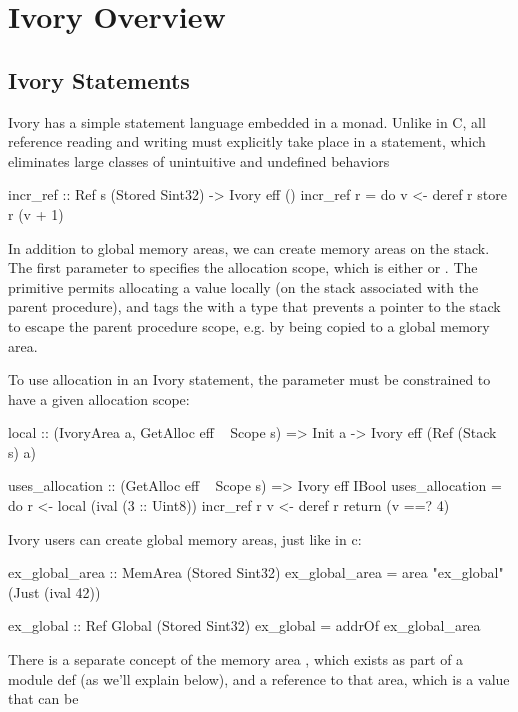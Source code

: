 \section{Ivory Overview}
\label{sec:ivory-overview}



\subsection{Ivory Statements}

Ivory has a simple statement language embedded in a monad. Unlike in C, all
reference reading and writing must explicitly take place in a statement, which
eliminates large classes of unintuitive and undefined behaviors 

\begin{code}
incr_ref :: Ref s (Stored Sint32) -> Ivory eff ()
incr_ref r = do
    v <- deref r
    store r (v + 1)
\end{code}

In addition to global memory areas, we can create memory areas on the stack.
The first parameter to  specifies the allocation scope, which is either
 or . The  primitive permits allocating a value
locally (on the stack associated with the parent procedure), and tags the
 with a type that prevents a pointer to the stack to escape the parent
procedure scope, e.g. by being copied to a global memory area.

To use allocation in an Ivory statement, the  parameter must be
constrained to have a given allocation scope:

\begin{code}
local :: (IvoryArea a, GetAlloc eff ~ Scope s)
      => Init a -> Ivory eff (Ref (Stack s) a)

uses_allocation :: (GetAlloc eff ~ Scope s) => Ivory eff IBool
uses_allocation = do
  r <- local (ival (3 :: Uint8))
  incr_ref r
  v <- deref r
  return (v ==? 4)

\end{code}

Ivory users can create global memory areas, just like in c:
\begin{code}
ex_global_area :: MemArea (Stored Sint32)
ex_global_area = area "ex_global" (Just (ival 42))

ex_global :: Ref Global (Stored Sint32)
ex_global = addrOf ex_global_area
\end{code}

There is a separate concept of the memory area , which
exists as part of a module def (as we'll explain below), and a reference
to that area, which is a value that can be 

